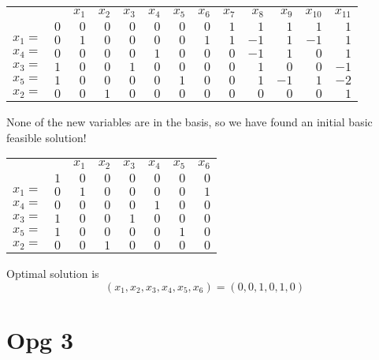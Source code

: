 \documentclass{article}
\theoremstyle{definition}
\begin{document}
\bgroup
\def\arraystretch{1.5}
\begin{table}[H]
  \begin{tabular}{r|r|rrrrrrrrrrr|}
  \cline{2-13}
    &   & $x_1$ & $x_2$ & $x_3$ & $x_4$ & $x_5$ & $x_6$ & $x_7$ & $x_8$ & $x_9$ & $x_10$ & $x_11$ \\ \cline{2-13}
    & $0$ & $0$ & $0$ & $0$ & $0$ & $0$ & $0$ & $1$ & $1$ & $1$ & $1$ & $1$ \\ \cline{2-13}
  $x_1 = $ & $0$ & $1$ & $0$ & $0$ & $0$ & $0$ & $1$ & $1$ & $-1$ & $1$ & $-1$ & $1$ \\ 
  $x_4 = $ & $0$ & $0$ & $0$ & $0$ & $1$ & $0$ & $0$ & $0$ & $-1$ & $1$ & $0$ & $1$ \\ 
  $x_3 = $ & $1$ & $0$ & $0$ & $1$ & $0$ & $0$ & $0$ & $0$ & $1$ & $0$ & $0$ & $-1$ \\ 
  $x_5 = $ & $1$ & $0$ & $0$ & $0$ & $0$ & $1$ & $0$ & $0$ & $1$ & $-1$ & $1$ & $-2$ \\ 
  $x_2 = $ & $0$ & $0$ & $1$ & $0$ & $0$ & $0$ & $0$ & $0$ & $0$ & $0$ & $0$ & $1$ \\ \cline{2-13}
  \end{tabular}
\end{table}
\egroup
None of the new variables are in the basis, so we have found an initial basic feasible solution!
\bgroup
\def\arraystretch{1.5}
\begin{table}[H]
  \begin{tabular}{r|r|rrrrrr|}
  \cline{2-8}
    &   & $x_1$ & $x_2$ & $x_3$ & $x_4$ & $x_5$ & $x_6$ \\ \cline{2-8}
    & $1$ & $0$ & $0$ & $0$ & $0$ & $0$ & $0$ \\ \cline{2-8}
  $x_1 = $ & $0$ & $1$ & $0$ & $0$ & $0$ & $0$ & $1$ \\ 
  $x_4 = $ & $0$ & $0$ & $0$ & $0$ & $1$ & $0$ & $0$ \\ 
  $x_3 = $ & $1$ & $0$ & $0$ & $1$ & $0$ & $0$ & $0$ \\ 
  $x_5 = $ & $1$ & $0$ & $0$ & $0$ & $0$ & $1$ & $0$ \\ 
  $x_2 = $ & $0$ & $0$ & $1$ & $0$ & $0$ & $0$ & $0$ \\ \cline{2-8}
  \end{tabular}
\end{table}
\egroup
Optimal solution is
\[
  (x_1, x_2, x_3, x_4, x_5, x_6) = (0, 0, 1, 0, 1, 0)
\]

\section*{Opg 3}
\end{document}
